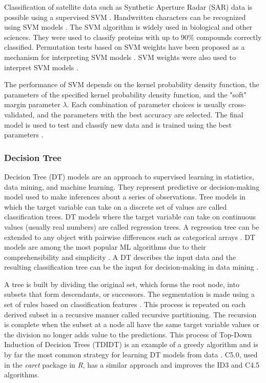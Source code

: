 \documentclass[sn-mathphys-num]{sn-jnl}%
\begin{document}
Classification of satellite data such as Synthetic Aperture Radar (SAR) data is possible using a supervised SVM \cite{Maity2016}. Handwritten characters can be recognized using SVM models \cite{Decoste2002, Maitra2015}. The SVM algorithm is widely used in biological and other sciences. They were used to classify proteins with up to $90\%$ compounds correctly classified. Permutation tests based on SVM weights have been proposed as a mechanism for interpreting SVM models \cite{Gaonkar2013, Cuingnet2011}. SVM weights were also used to interpret SVM models \cite{Statnikov2006}.

The performance of SVM depends on the kernel probability density function, the parameters of the specified kernel probability density function, and the "soft" margin parameter $\lambda$. Each combination of parameter choices is usually cross-validated, and the parameters with the best accuracy are selected. The final model is used to test and classify new data and is trained using the best parameters \cite{Hsu2003}.

\subsubsection{Decision Tree}

Decision Tree (DT) models are an approach to supervised learning in statistics, data mining, and machine learning. They represent predictive or decision-making model used to make inferences about a series of observations. Tree models in which the target variable can take on a discrete set of values are called classification trees. DT models where the target variable can take on continuous values (usually real numbers) are called regression trees. A regression tree can be extended to any object with pairwise differences such as categorical arrays \cite{Studer2011}. DT models are among the most popular ML algorithms due to their comprehensibility and simplicity \cite{Wu2008}. A DT describes the input data and the resulting classification tree can be the input for decision-making in data mining \cite{Rokach2014}.

A tree is built by dividing the original set, which forms the root node, into subsets that form descendants, or successors. The segmentation is made using a set of rules based on classification features \cite{ShalevShwartz2014}. This process is repeated on each derived subset in a recursive manner called recursive partitioning. The recursion is complete when the subset at a node all have the same target variable values or the division no longer adds value to the predictions. This process of Top-Down Induction of Decision Trees (TDIDT) \cite{Quinlan1986} is an example of a greedy algorithm and is by far the most common strategy for learning DT models from data \cite{Rokach2005}. C5.0, used in the \textit{caret} package in \textit{R}, has a similar approach and improves the ID3 and C4.5 algorithms.
\end{document}
